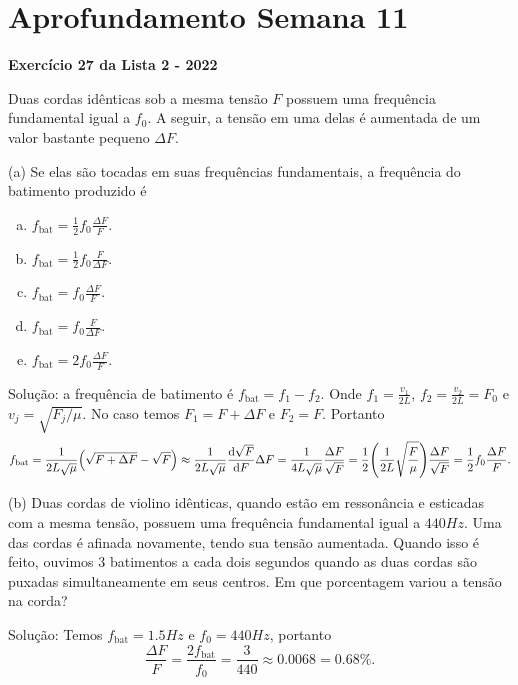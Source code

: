 \documentclass[a4paper,10pt]{article}
\newcommand{\fbat}{f_{\text{bat}}}
\begin{document}
\section{Aprofundamento Semana 11}

\textbf{Exercício 27 da Lista 2 - 2022}


Duas cordas idênticas sob a mesma tensão $F$ possuem uma frequência fundamental igual a $f_0$. A seguir, a tensão em uma delas é aumentada de um valor bastante pequeno $\Delta F$.

\n\n

(a) Se elas são tocadas em suas frequências fundamentais, a frequência do batimento produzido é
\begin{enumerate}[(a)]
\item $ f_{\text{bat}} = \frac{1}{2} f_0 \frac{\Delta F}{F}. $
\item $ f_{\text{bat}} = \frac{1}{2} f_0 \frac{F}{\Delta F}. $
\item $ f_{\text{bat}} = f_0 \frac{\Delta F}{F}. $
\item $ f_{\text{bat}} = f_0 \frac{F}{\Delta F}. $
\item $ f_{\text{bat}} = 2 f_0 \frac{\Delta F}{F}. $
\end{enumerate}


\n

Solução: a frequência de batimento é $\fbat = f_1 - f_2$. Onde $f_1 = \frac{v_1}{2L}$, $f_2 = \frac{v_2}{2L} = F_0$ e $v_j = \sqrt{F_j/\mu}$. No caso temos $F_1 = F + \Delta F$ e $F_2 = F$. Portanto
$$
\fbat = \frac{1}{2L\sqrt{\mu}} \qty(\sqrt{F+\Delta F} - \sqrt{F}) \approx
\frac{1}{2L\sqrt{\mu}} \dv{\sqrt{F}}{F} \Delta F = \frac{1}{4L\sqrt{\mu}} \frac{\Delta F}{\sqrt{F}} =
\frac{1}{2} \qty(\frac{1}{2L} \sqrt{\frac{F}{\mu}}) \frac{\Delta F}{\sqrt{F}} =\frac{1}{2} f_0 \frac{\Delta F}{F}.
$$


\n

(b) Duas cordas de violino idênticas, quando estão em ressonância e esticadas com
a mesma tensão, possuem uma frequência fundamental igual a $440 \unit{Hz}$. Uma
das cordas é afinada novamente, tendo sua tensão aumentada. Quando isso é
feito, ouvimos $3$ batimentos a cada dois segundos quando as duas cordas são puxadas
simultaneamente em seus centros. Em que porcentagem variou a tensão na corda?

\n

Solução: Temos $\fbat = 1.5 \unit{Hz}$ e $f_0 = 440 \unit{Hz}$, portanto
$$
\frac{\Delta F}{F} = \frac{2 \fbat}{f_0} = \frac{3}{440} \approx 0.0068 = 0.68\%.
$$
\end{document}
